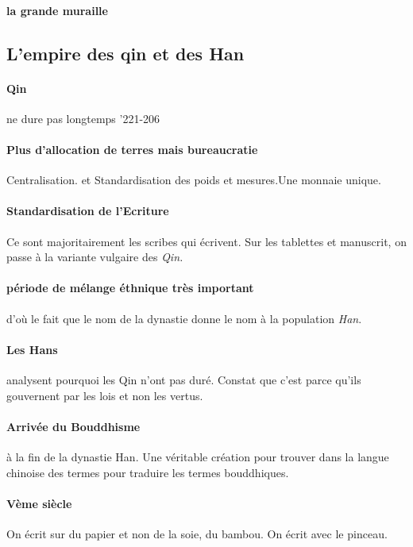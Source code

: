 \paragraph{la grande muraille} 

\subsection{L'empire des qin et des Han }
\paragraph{Qin} ne dure pas longtemps '221-206
\paragraph{Plus d'allocation de terres mais bureaucratie} Centralisation. et Standardisation des poids et mesures.Une monnaie unique. 

\paragraph{Standardisation de l'Ecriture} Ce sont majoritairement les scribes qui écrivent. Sur les tablettes et manuscrit, on passe à la variante vulgaire des \textit{Qin. } 

\paragraph{période de mélange éthnique très important} d'où le fait que le nom de la dynastie donne le nom à la population \textit{Han}. 

\paragraph{Les Hans} analysent pourquoi les Qin n'ont pas duré. Constat que c'est parce qu'ils gouvernent par les lois et non les vertus.

\paragraph{Arrivée du Bouddhisme} à la fin de la dynastie Han. 
Une véritable création pour trouver dans la langue chinoise des termes pour traduire les termes bouddhiques. 

\paragraph{Vème siècle} On écrit sur du papier et non de la soie, du bambou. On écrit avec le pinceau. 

